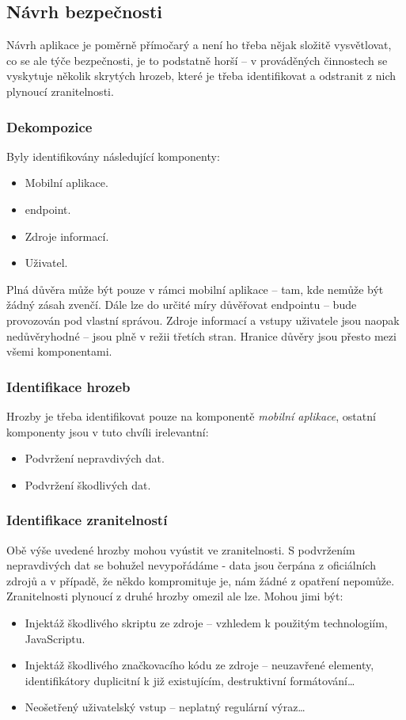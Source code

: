 \subsection{Návrh bezpečnosti}
Návrh aplikace je poměrně přímočarý a není ho třeba nějak složitě vysvětlovat, co se ale týče bezpečnosti, je to podstatně horší -- v prováděných činnostech se vyskytuje několik skrytých hrozeb, které je třeba identifikovat a odstranit z nich plynoucí zranitelnosti.

\subsubsection{Dekompozice}
Byly identifikovány následující komponenty:
\begin{itemize}
 \item Mobilní aplikace.
 \item {} endpoint.
 \item Zdroje informací.
 \item Uživatel.
\end{itemize}
Plná důvěra může být pouze v rámci mobilní aplikace -- tam, kde nemůže být žádný zásah zvenčí. Dále lze do určité míry důvěřovat  endpointu -- bude provozován pod vlastní správou. Zdroje informací a vstupy uživatele jsou naopak nedůvěryhodné -- jsou plně v režii třetích stran. Hranice důvěry jsou přesto mezi všemi komponentami.

\subsubsection{Identifikace hrozeb}
Hrozby je třeba identifikovat pouze na komponentě \emph{mobilní aplikace}, ostatní komponenty jsou v tuto chvíli irelevantní:
\begin{itemize}
 \item Podvržení nepravdivých dat.
 \item Podvržení škodlivých dat.
\end{itemize}

\subsubsection{Identifikace zranitelností}
Obě výše uvedené hrozby mohou vyústit ve zranitelnosti. S podvržením nepravdivých dat se bohužel nevypořádáme - data jsou čerpána z oficiálních zdrojů a v případě, že někdo kompromituje je, nám žádné z opatření nepomůže. Zranitelnosti plynoucí z druhé hrozby omezil ale lze. Mohou jimi být:
\begin{itemize}
 \item Injektáž škodlivého skriptu ze zdroje -- vzhledem k použitým technologiím, JavaScriptu.
 \item Injektáž škodlivého značkovacího kódu ze zdroje -- neuzavřené  elementy, identifikátory duplicitní k již existujícím, destruktivní formátování\dots
 \item Neošetřený uživatelský vstup -- neplatný regulární výraz\dots
\end{itemize}

